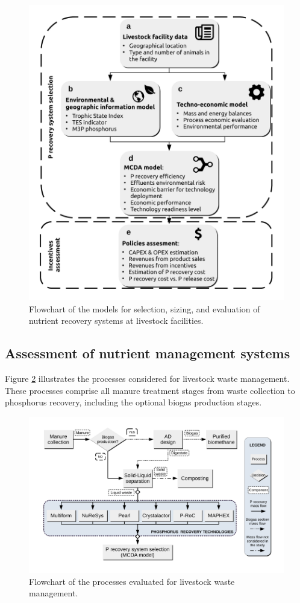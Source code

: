 \begin{refsection}[referencesCh5]
\begin{figure}[h]
	\centering
	\includegraphics[width=0.7\linewidth, trim={1cm 1cm 1cm 1cm},clip]{gfx/Chapter5/tool_diagram_v4color} 
	\caption{Flowchart of the models for selection, sizing, and evaluation of nutrient recovery systems at livestock facilities.}
	\label{fig:tool_diagram}
\end{figure}

\subsection{Assessment of nutrient management systems}
Figure \ref{fig:techs_diagrams} illustrates the processes considered for livestock waste management. These processes comprise all manure treatment stages from waste collection to phosphorus recovery, including the optional biogas production stages.

\begin{figure}[h]
	\centering
	\includegraphics[width=0.85\linewidth, trim={1.5cm 1.5cm 1.5cm 1.5cm},clip]{gfx/Chapter5/Process_Flowsheet.pdf} 
	\caption{Flowchart of the processes evaluated for livestock waste management.}
	\label{fig:techs_diagrams}
\end{figure}


\end{refsection}
